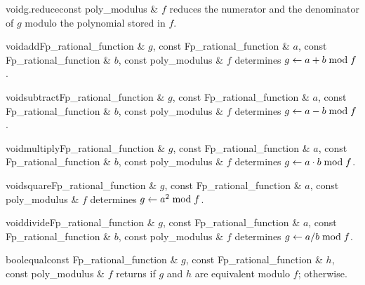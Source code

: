 \begin{fcode}{void}{g.reduce}{const poly_modulus & $f$}
  reduces the numerator and the denominator of $g$ modulo the polynomial stored in $f$.
\end{fcode}

\begin{fcode}{void}{add}{Fp_rational_function & $g$, const Fp_rational_function & $a$,
    const Fp_rational_function & $b$, const poly_modulus & $f$}%
  determines $g \leftarrow a + b \bmod f$.
\end{fcode}

\begin{fcode}{void}{subtract}{Fp_rational_function & $g$, const Fp_rational_function & $a$,
    const Fp_rational_function & $b$, const poly_modulus & $f$}
  determines $g \leftarrow a - b \bmod f$.
\end{fcode}

\begin{fcode}{void}{multiply}{Fp_rational_function & $g$, const Fp_rational_function & $a$,
    const Fp_rational_function & $b$, const poly_modulus & $f$}%
  determines $g \leftarrow a \cdot b \bmod f$.
\end{fcode}

\begin{fcode}{void}{square}{Fp_rational_function & $g$, const Fp_rational_function & $a$,
    const poly_modulus & $f$}%
  determines $g \leftarrow a^2 \bmod f$.
\end{fcode}

\begin{fcode}{void}{divide}{Fp_rational_function & $g$, const Fp_rational_function & $a$,
    const Fp_rational_function & $b$, const poly_modulus & $f$}%
  determines $g \leftarrow a / b \bmod f$.
\end{fcode}

\begin{fcode}{bool}{equal}{const Fp_rational_function & $g$, const Fp_rational_function & $h$,
    const poly_modulus & $f$}%
  returns \TRUE if $g$ and $h$ are equivalent modulo $f$; \FALSE otherwise.
\end{fcode}



\IO

